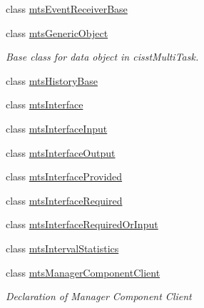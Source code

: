 \begin{DoxyCompactItemize}
\item 
class \hyperlink{classmts_event_receiver_base}{mts\-Event\-Receiver\-Base}
\item 
class \hyperlink{classmts_generic_object}{mts\-Generic\-Object}
\begin{DoxyCompactList}\small\item\em Base class for data object in cisst\-Multi\-Task. \end{DoxyCompactList}\item 
class \hyperlink{classmts_history_base}{mts\-History\-Base}
\item 
class \hyperlink{classmts_interface}{mts\-Interface}
\item 
class \hyperlink{classmts_interface_input}{mts\-Interface\-Input}
\item 
class \hyperlink{classmts_interface_output}{mts\-Interface\-Output}
\item 
class \hyperlink{classmts_interface_provided}{mts\-Interface\-Provided}
\item 
class \hyperlink{classmts_interface_required}{mts\-Interface\-Required}
\item 
class \hyperlink{classmts_interface_required_or_input}{mts\-Interface\-Required\-Or\-Input}
\item 
class \hyperlink{classmts_interval_statistics}{mts\-Interval\-Statistics}
\item 
class \hyperlink{classmts_manager_component_client}{mts\-Manager\-Component\-Client}
\begin{DoxyCompactList}\small\item\em Declaration of Manager Component Client


\end{DoxyCompactList}
\end{DoxyCompactItemize}
